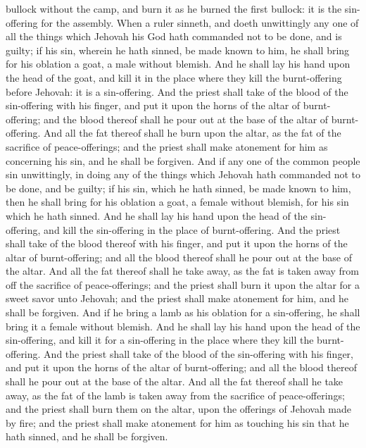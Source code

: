 bullock without the camp, and burn it as he burned the first bullock: it is the sin-offering for the assembly.  When a ruler sinneth, and doeth unwittingly any one of all the things which Jehovah his God hath commanded not to be done, and is guilty; if his sin, wherein he hath sinned, be made known to him, he shall bring for his oblation a goat, a male without blemish. And he shall lay his hand upon the head of the goat, and kill it in the place where they kill the burnt-offering before Jehovah: it is a sin-offering. And the priest shall take of the blood of the sin-offering with his finger, and put it upon the horns of the altar of burnt-offering; and the blood thereof shall he pour out at the base of the altar of burnt-offering. And all the fat thereof shall he burn upon the altar, as the fat of the sacrifice of peace-offerings; and the priest shall make atonement for him as concerning his sin, and he shall be forgiven.  And if any one of the common people sin unwittingly, in doing any of the things which Jehovah hath commanded not to be done, and be guilty; if his sin, which he hath sinned, be made known to him, then he shall bring for his oblation a goat, a female without blemish, for his sin which he hath sinned. And he shall lay his hand upon the head of the sin-offering, and kill the sin-offering in the place of burnt-offering. And the priest shall take of the blood thereof with his finger, and put it upon the horns of the altar of burnt-offering; and all the blood thereof shall he pour out at the base of the altar. And all the fat thereof shall he take away, as the fat is taken away from off the sacrifice of peace-offerings; and the priest shall burn it upon the altar for a sweet savor unto Jehovah; and the priest shall make atonement for him, and he shall be forgiven.  And if he bring a lamb as his oblation for a sin-offering, he shall bring it a female without blemish. And he shall lay his hand upon the head of the sin-offering, and kill it for a sin-offering in the place where they kill the burnt-offering. And the priest shall take of the blood of the sin-offering with his finger, and put it upon the horns of the altar of burnt-offering; and all the blood thereof shall he pour out at the base of the altar. And all the fat thereof shall he take away, as the fat of the lamb is taken away from the sacrifice of peace-offerings; and the priest shall burn them on the altar, upon the offerings of Jehovah made by fire; and the priest shall make atonement for him as touching his sin that he hath sinned, and he shall be forgiven. 


